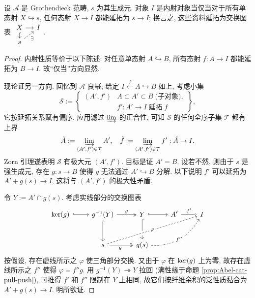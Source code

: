 \begin{lemma}\label{prop:Grothendieck-injective-criterion}
	设 $\mathcal{A}$ 是 Grothendieck 范畴, $s$ 为其生成元. 对象 $I$ 是内射对象当仅当对于所有单态射 $X \hookrightarrow s$, 任何态射 $X \to I$ 都能延拓为 $s \to I$; 换言之, 这些资料延拓为交换图表
	$\begin{tikzcd}[row sep=small, column sep=small]
		X \arrow[r] \arrow[hookrightarrow, d] & I \\
		s \arrow[dashed, ru, "\exists"'] &
	\end{tikzcd}$.
\end{lemma}
\begin{proof}
	内射性质等价于以下陈述: 对任意单态射 $A \hookrightarrow B$, 所有态射 $f: A \to I$ 都能延拓为 $B \to I$. 故``仅当''方向显然.

	现论证另一方向. 回忆到 $\mathcal{A}$ 良幂; 给定 $I \xleftarrow{f} A \hookrightarrow B$ 如上, 考虑小集
	\[ \mathcal{S} := \left\{\begin{array}{r|l}
		(A', f') & A \subset A' \subset B \; \text{(子对象)}, \\
		& f': A' \to I \;\text{延拓}\; f
	\end{array}\right\}, \]
	它按延拓关系赋有偏序. 应用滤过 $\varinjlim$ 的正合性, 可知 $\mathcal{S}$ 的任何全序子集 $\mathcal{T}$ 都有上界
	\[ \tilde{A} := \varinjlim_{(A', f') \in \mathcal{T}} A', \quad \tilde{f} := \varinjlim_{(A', f') \in \mathcal{T}} f' : \tilde{A} \to I . \]
	Zorn 引理遂表明 $\mathcal{S}$ 有极大元 $(A', f')$. 目标是证 $A' = B$. 设若不然, 则由于 $s$ 是强生成元, 存在 $g: s \to B$ 使得 $g$ 无法通过 $A' \hookrightarrow B$ 分解. 以下说明 $f'$ 可以延拓为 $A' + g(s) \to I$, 这将与 $(A', f')$ 的极大性矛盾.

	令 $Y := A' \cap g(s)$. 考虑实线部分的交换图表
	\[\begin{tikzcd}[row sep=large]
		\Ker(g) \arrow[hookrightarrow, r] & g^{-1}(Y) \arrow[twoheadrightarrow, r, "g"] \arrow[hookrightarrow, d] & Y \arrow[hookrightarrow, r] \arrow[hookrightarrow, d] & A' \arrow[r, "{f'}"] & I \\
		& s \arrow[twoheadrightarrow, r, "g"'] \arrow[dashed, rrru, crossing over, "\varphi" description] & g(s) \arrow[dashed, bend right, rru, "{f''}" description] & &
	\end{tikzcd}\]
	按假设, 存在虚线所示之 $\varphi$ 使三角部分交换. 又由于 $\varphi$ 在 $\operatorname{ker}(g)$ 上为零, 故存在虚线所示之 $f''$ 使得 $\varphi = f'' g$. 用 $g^{-1}(Y) \twoheadrightarrow Y$ 拉回 (满性缘于命题 \ref{prop:Abel-cat-pull-push}), 可推得 $f'$ 和 $f''$ 限制在 $Y$ 上相同, 故它们按纤维余积的泛性质黏合为 $A' + g(s) \to I$. 明所欲证.
\end{proof}

